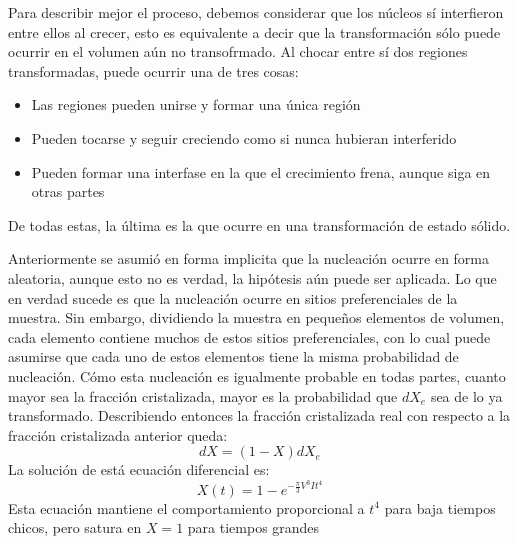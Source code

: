 \documentclass{article}
\theoremstyle{definition}
\theoremstyle{remark}
\begin{document}
Para describir mejor el proceso, debemos considerar que los núcleos sí interfieron entre ellos al crecer, esto es equivalente a decir que la transformación sólo puede ocurrir en el volumen aún no transofrmado. Al chocar entre sí dos regiones transformadas, puede ocurrir una de tres cosas:
\begin{itemize}
\item Las regiones pueden unirse y formar una única región
\item Pueden tocarse y seguir creciendo como si nunca hubieran interferido
\item Pueden formar una interfase en la que el crecimiento frena, aunque siga en otras partes
\end{itemize}

De todas estas, la última es la que ocurre en una transformación de estado sólido.

Anteriormente se asumió en forma implicita que la nucleación ocurre en forma aleatoria, aunque esto no es verdad, la hipótesis aún puede ser aplicada. Lo que en verdad sucede es que la nucleación ocurre en sitios preferenciales de la muestra. Sin embargo, dividiendo la muestra en pequeños elementos de volumen, cada elemento contiene muchos de estos sitios preferenciales, con lo cual puede asumirse que cada uno de estos elementos tiene la misma probabilidad de nucleación. Cómo esta nucleación es igualmente probable en todas partes, cuanto mayor sea la fracción cristalizada, mayor es la probabilidad que $dX_e$ sea de lo ya transformado. Describiendo entonces la fracción cristalizada real con respecto a la fracción cristalizada anterior queda:
\begin{equation}
 dX = (1 - X)dX_e
\end{equation}
La solución de está ecuación diferencial es:
\begin{equation}
	X(t)=1-e^{-\frac{\pi}{3}V^3 I t^4}
\end{equation}
Esta ecuación mantiene el comportamiento proporcional a $t^4$ para baja tiempos chicos, pero satura en $X = 1$ para tiempos grandes
\end{document}
